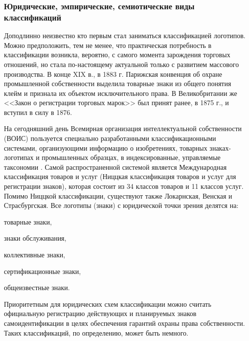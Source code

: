 \subsubsection{Юридические, эмпирические, семиотические виды классификаций}

Доподлинно неизвестно кто первым стал заниматься классификацией логотипов. Можно предположить, тем
не менее, что практическая потребность в классификации возникла, вероятно, с самого момента
зарождения торговых отношений, но стала по-настоящему актуальной только с развитием массового
производства. В конце XIX в., в 1883 г. Парижская конвенция об охране промышленной собственности
выделила товарные знаки из общего понятия клейм и признала их объектом исключительного права. В
Великобритании же <<Закон о регистрации торговых марок>> был принят ранее, в 1875 г., и вступил в силу
в 1876.

На сегодняшний день Всемирная организация интеллектуальной собственности (ВОИС) пользуется
специально разработанными классификационными системами, организующими информацию о изобретениях,
товарных знаках-логотипах и промышленных образцах, в индексированные, управляемые
таксономии \autocite{vois}. Самой распространенной системой является
Международная классификация товаров и услуг (Ниццкая классификация товаров и услуг для регистрации
знаков), которая состоит из 34 классов товаров и 11 классов услуг. Помимо Ниццкой
классификации, существуют также Локарнская, Венская и Страсбургская. Все логотипы (знаки) с
юридической точки зрения делятся на:
\begin{enumerate*}[label=\arabic*)]
\item товарные знаки,
\item знаки обслуживания,
\item коллективные знаки,
\item сертификационные знаки,
\item общеизвестные знаки.
\end{enumerate*}

Приоритетным для юридических схем классификации можно считать официальную регистрацию действующих и
планируемых знаков самоидентификации в целях обеспечения гарантий охраны права собственности. Таких
классификаций, по определению, может быть немного.

